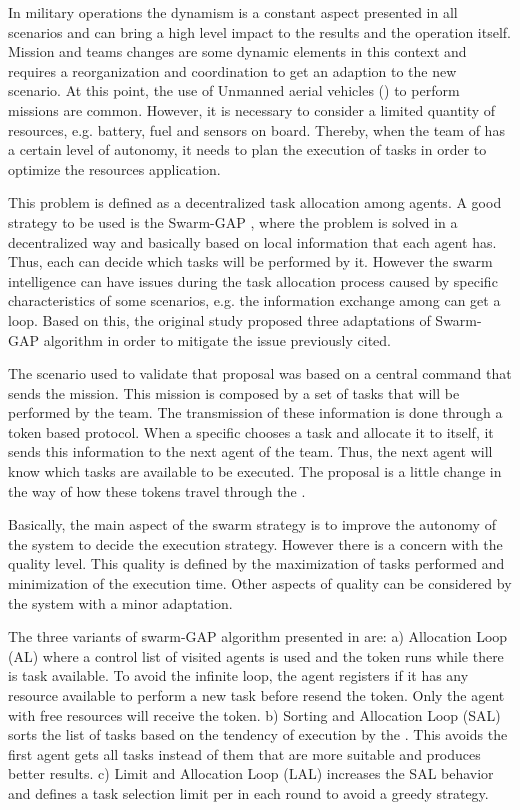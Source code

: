 In military operations the dynamism is a constant aspect presented in all scenarios and can bring a high level impact to the results and the operation itself. Mission and teams changes are some dynamic elements in this context and requires a reorganization and coordination to get an adaption to the new scenario. At this point, the use of Unmanned aerial vehicles (\uav) to perform missions are common. However, it is necessary to consider a limited quantity of resources, e.g. battery, fuel and sensors on board. Thereby, when the team of \uav has a certain level of autonomy, it needs to plan the execution of tasks in order to optimize the resources application.

This problem is defined as a decentralized task allocation among agents. A good strategy to be used is the Swarm-GAP \cite{MOEA07}\cite{MAS07}, where the problem is solved in a decentralized way and basically based on local information that each agent has. Thus, each \uav can decide which tasks will be performed by it. However the swarm intelligence can have issues during the task allocation process caused by specific characteristics of some scenarios, e.g. the information exchange among \uavs can get a loop. Based on this, the original study \cite{MAS07} proposed three adaptations of Swarm-GAP algorithm in order to mitigate the issue previously cited.

The scenario used to validate that proposal was based on a central command that sends the mission. This mission is composed by a set of tasks that will be performed by the \uav team. The transmission of these information is done through a token based protocol. When a specific \uav chooses a task and allocate it to itself, it sends this information to the next agent of the team. Thus, the next agent will know which tasks are available to be executed. The proposal is a little change in the way of how these tokens travel through the \uavs.

Basically, the main aspect of the swarm strategy is to improve the autonomy of the system to decide the execution strategy. However there is a concern with the quality level. This quality is defined by the maximization of tasks performed and minimization of the execution time. Other aspects of quality can be considered by the system with a minor adaptation.

The three variants of swarm-GAP algorithm presented in \cite{MAS07} are: a) Allocation Loop (AL) where a control list of visited agents is used and the token runs while there is task available. To avoid the infinite loop, the agent registers if it has any resource available to perform a new task before resend the token. Only the agent with free resources will receive the token. b) Sorting and Allocation Loop (SAL) sorts the list of tasks based on the tendency of execution by the \uav. This avoids the first agent gets all tasks instead of them that are more suitable and produces better results. c) Limit and Allocation Loop (LAL) increases the SAL behavior and defines a task selection limit per \uav in each round to avoid a greedy strategy.

